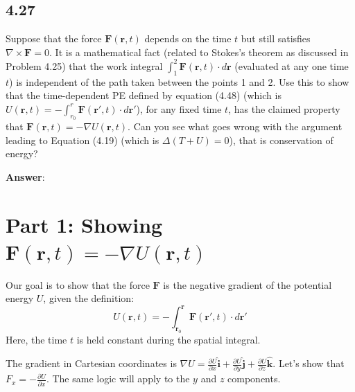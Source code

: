 \documentclass[11pt, a4paper]{article} %
\begin{document}
\subsection*{4.27}

Suppose that the force $\mathbf{F} (\mathbf{r}, t)$ depends on the time $t$ but still satisfies $\nabla \times \mathbf{F} = 0$. It is a mathematical fact (related to Stokes's theorem as discussed in Problem 4.25) that the work integral $\int_1^2 \mathbf{F} (\mathbf{r}, t) \cdot d \mathbf{r}$ (evaluated at any one time $t$) is independent of the path taken between the points 1 and 2. Use this to show that the time-dependent PE defined by equation (4.48) (which is $U(\mathbf{r}, t) = - \int_{r_0}^r \mathbf{F} (\mathbf{r}', t) \cdot d \mathbf{r}'$), for any fixed time $t$, has the claimed property that $\mathbf{F} (\mathbf{r}, t) = - \nabla U(\mathbf{r}, t)$. Can you see what goes wrong with the argument leading to Equation (4.19) (which is $\Delta (T + U) = 0$), that is conservation of energy?

\textbf{Answer}:

\section*{Part 1: Showing $\mathbf{F}(\mathbf{r}, t) = - \nabla U(\mathbf{r}, t)$}

Our goal is to show that the force $\mathbf{F}$ is the negative gradient of the potential energy $U$, given the definition:
$$U(\mathbf{r}, t) = - \int_{\mathbf{r}_0}^{\mathbf{r}} \mathbf{F}(\mathbf{r}', t) \cdot d\mathbf{r}'$$
Here, the time $t$ is held constant during the spatial integral.

The gradient in Cartesian coordinates is $\nabla U = \frac{\partial U}{\partial x}\hat{\mathbf{i}} + \frac{\partial U}{\partial y}\hat{\mathbf{j}} + \frac{\partial U}{\partial z}\hat{\mathbf{k}}$. Let's show that $F_x = -\frac{\partial U}{\partial x}$. The same logic will apply to the $y$ and $z$ components.
\end{document}
